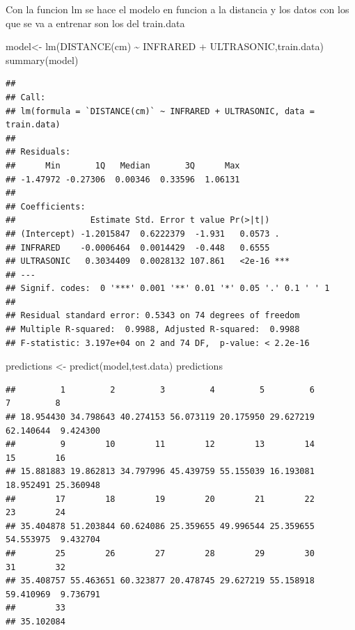 \documentclass[
]{article}
\newenvironment{Shaded}{\begin{snugshade}}{\end{snugshade}}
\newcommand{\AttributeTok}[1]{\textcolor[rgb]{0.77,0.63,0.00}{#1}}
\newcommand{\FunctionTok}[1]{\textcolor[rgb]{0.00,0.00,0.00}{#1}}
\newcommand{\NormalTok}[1]{#1}
\newcommand{\OtherTok}[1]{\textcolor[rgb]{0.56,0.35,0.01}{#1}}
\newcommand{\SpecialCharTok}[1]{\textcolor[rgb]{0.00,0.00,0.00}{#1}}
\newcommand{\StringTok}[1]{\textcolor[rgb]{0.31,0.60,0.02}{#1}}
\begin{document}
Con la funcion lm se hace el modelo en funcion a la distancia y los
datos con los que se va a entrenar son los del train.data

\begin{Shaded}
\begin{Highlighting}[]
\NormalTok{model}\OtherTok{\textless{}{-}} \FunctionTok{lm}\NormalTok{(}\StringTok{\textasciigrave{}}\AttributeTok{DISTANCE(cm)}\StringTok{\textasciigrave{}} \SpecialCharTok{\textasciitilde{}}\NormalTok{ INFRARED }\SpecialCharTok{+}\NormalTok{ ULTRASONIC,train.data)}
\FunctionTok{summary}\NormalTok{(model)}
\end{Highlighting}
\end{Shaded}

\begin{verbatim}
## 
## Call:
## lm(formula = `DISTANCE(cm)` ~ INFRARED + ULTRASONIC, data = train.data)
## 
## Residuals:
##      Min       1Q   Median       3Q      Max 
## -1.47972 -0.27306  0.00346  0.33596  1.06131 
## 
## Coefficients:
##               Estimate Std. Error t value Pr(>|t|)    
## (Intercept) -1.2015847  0.6222379  -1.931   0.0573 .  
## INFRARED    -0.0006464  0.0014429  -0.448   0.6555    
## ULTRASONIC   0.3034409  0.0028132 107.861   <2e-16 ***
## ---
## Signif. codes:  0 '***' 0.001 '**' 0.01 '*' 0.05 '.' 0.1 ' ' 1
## 
## Residual standard error: 0.5343 on 74 degrees of freedom
## Multiple R-squared:  0.9988, Adjusted R-squared:  0.9988 
## F-statistic: 3.197e+04 on 2 and 74 DF,  p-value: < 2.2e-16
\end{verbatim}

\begin{Shaded}
\begin{Highlighting}[]
\NormalTok{predictions }\OtherTok{\textless{}{-}} \FunctionTok{predict}\NormalTok{(model,test.data)}
\NormalTok{predictions}
\end{Highlighting}
\end{Shaded}

\begin{verbatim}
##         1         2         3         4         5         6         7         8 
## 18.954430 34.798643 40.274153 56.073119 20.175950 29.627219 62.140644  9.424300 
##         9        10        11        12        13        14        15        16 
## 15.881883 19.862813 34.797996 45.439759 55.155039 16.193081 18.952491 25.360948 
##        17        18        19        20        21        22        23        24 
## 35.404878 51.203844 60.624086 25.359655 49.996544 25.359655 54.553975  9.432704 
##        25        26        27        28        29        30        31        32 
## 35.408757 55.463651 60.323877 20.478745 29.627219 55.158918 59.410969  9.736791 
##        33 
## 35.102084
\end{verbatim}
\end{document}

